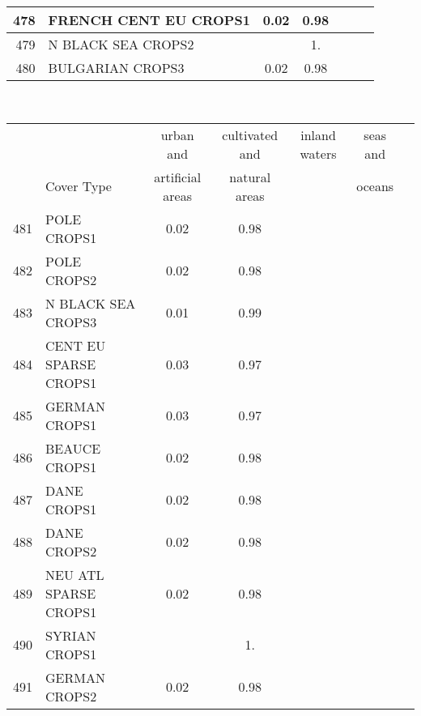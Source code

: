 {{\begin{tabular}{||r|l||c|c|c|c|c||}
 \hline
         478  & FRENCH CENT EU CROPS1                                        &  0.02 &  0.98 &       &       \\
 \hline
         479  & N BLACK SEA CROPS2                                           &       &  1.   &       &       \\
 \hline
         480  & BULGARIAN CROPS3                                             &  0.02 &  0.98 &       &       \\
 \hline
 \end{tabular}
 \clearpage
 \medskip\
 \begin{tabular}{||r|l||c|c|c|c|c||}
 \hline
 \hline
 && urban and & cultivated and &inland waters&seas and\\
 &Cover Type& artificial areas & natural areas&&oceans\\
 \hline
 \hline
         481  & POLE CROPS1                                                  &  0.02 &  0.98 &       &       \\
 \hline
         482  & POLE CROPS2                                                  &  0.02 &  0.98 &       &       \\
 \hline
         483  & N BLACK SEA CROPS3                                           &  0.01 &  0.99 &       &       \\
 \hline
         484  & CENT EU SPARSE CROPS1                                        &  0.03 &  0.97 &       &       \\
 \hline
         485  & GERMAN CROPS1                                                &  0.03 &  0.97 &       &       \\
 \hline
         486  & BEAUCE CROPS1                                                &  0.02 &  0.98 &       &       \\
 \hline
         487  & DANE CROPS1                                                  &  0.02 &  0.98 &       &       \\
 \hline
         488  & DANE CROPS2                                                  &  0.02 &  0.98 &       &       \\
 \hline
         489  & NEU ATL SPARSE CROPS1                                        &  0.02 &  0.98 &       &       \\
 \hline
         490  & SYRIAN CROPS1                                                &       &  1.   &       &       \\
 \hline
         491  & GERMAN CROPS2                                                &  0.02 &  0.98 &       &       \\

\end{tabular}}}

